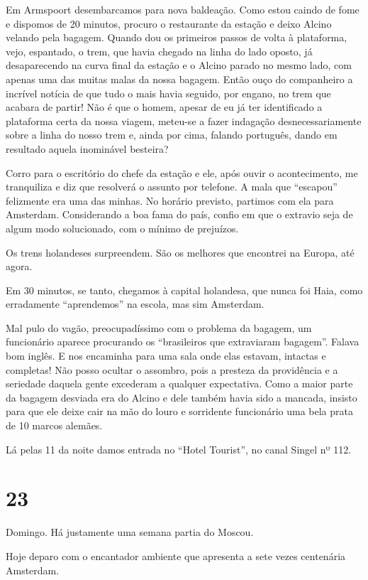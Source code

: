 Em Armspoort desembarcamos para nova baldeação. Como estou caindo de fome e dispomos de 20 minutos, procuro o restaurante da estação e deixo Alcino velando pela bagagem. Quando dou os primeiros passos de volta à plataforma, vejo, espantado, o trem, que havia chegado na linha do lado oposto, já desaparecendo na curva final da estação e o Alcino parado no mesmo lado, com apenas uma das muitas malas da nossa bagagem. Então ouço do companheiro a incrível notícia de que tudo o mais havia seguido, por engano, no trem que acabara de partir! Não é que o homem, apesar de eu já ter identificado a plataforma certa da nossa viagem, meteu-se a fazer indagação desnecessariamente sobre a linha do nosso trem e, ainda por cima, falando português, dando em resultado aquela inominável besteira?

Corro para o escritório do chefe da estação e ele, após ouvir o acontecimento, me tranquiliza e diz que resolverá o assunto por telefone. A mala que ``escapou'' felizmente era uma das minhas. No horário previsto, partimos com ela para Amsterdam. Considerando a boa fama do país, confio em que o extravio seja de algum modo solucionado, com o mínimo de prejuízos.

Os trens holandeses surpreendem. São os melhores que encontrei na Europa, até agora.

Em 30 minutos, se tanto, chegamos à capital holandesa, que nunca foi Haia, como erradamente ``aprendemos'' na escola, mas sim Amsterdam.

Mal pulo do vagão, preocupadíssimo com o problema da bagagem, um funcionário aparece procurando os ``brasileiros que extraviaram bagagem''. Falava bom inglês. E nos encaminha para uma sala onde elas estavam, intactas e completas! Não posso ocultar o assombro, pois a presteza da providência e a seriedade daquela gente excederam a qualquer expectativa. Como a maior parte da bagagem desviada era do Alcino e dele também havia sido a mancada, insisto para que ele deixe cair na mão do louro e sorridente funcionário uma bela prata de 10 marcos alemães.

Lá pelas 11 da noite damos entrada no ``Hotel Tourist'', no canal Singel nº 112.

\section*{23 \adfflatleafright {}}
Domingo. Há justamente uma semana partia do Moscou.

Hoje deparo com o encantador ambiente que apresenta a sete vezes centenária Amsterdam.

